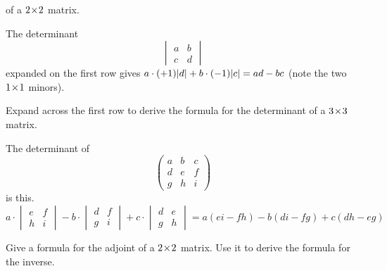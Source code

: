 \begin{exercises}
    of a \( 2 \! \times \! 2  \) matrix.
    \begin{answer}
       The determinant
       \begin{equation*}
         \begin{vmatrix}
           a  &b  \\
           c  &d
         \end{vmatrix}
       \end{equation*} 
       expanded on the first row gives    
       \( a\cdot (+1)\deter{d}+b\cdot (-1)\deter{c}=ad-bc \)
       (note the two $1 \! \times \! 1$ minors).
     \end{answer}
  \recommended \item
    Expand across the first row to derive the formula for the determinant
    of a \( 3 \! \times \! 3 \) matrix.
    \begin{answer}
      The determinant of
      \begin{equation*}
        \begin{pmatrix}
          a  &b  &c  \\
          d  &e  &f  \\
          g  &h  &i
        \end{pmatrix}
      \end{equation*}
      is this.
      \begin{equation*}
        a\cdot \begin{vmatrix}
            e  &f  \\
            h  &i
         \end{vmatrix}
        -b\cdot \begin{vmatrix}
            d  &f  \\
            g  &i
         \end{vmatrix}
        +c\cdot \begin{vmatrix}
            d  &e  \\
            g  &h
         \end{vmatrix}
        =a(ei-fh)-b(di-fg)+c(dh-eg)
      \end{equation*}  
    \end{answer}
  \recommended \item 
   \begin{exparts}
     \partsitem Give a formula for the adjoint of a \( 2 \! \times \! 2 \) matrix.
     \partsitem Use it to derive the formula for the inverse.
   \end{exparts} 
    \begin{answer}
      \begin{exparts}

\end{exparts}
\end{answer}
\end{exercises}
